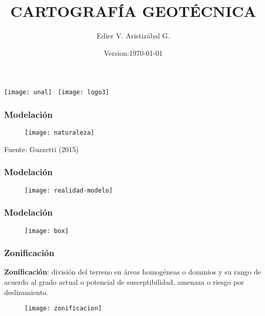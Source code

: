 \documentclass[12pt]{beamer}
\title[Principios de ocurrencia]{CARTOGRAFÍA GEOTÉCNICA}
\author[Edier Aristizábal]{Edier V. Aristizábal G.}
\institute{\emph{evaristizabalg@unal.edu.co}}
\date{Version:\today}
\begin{document}
\begin{frame}
\titlepage
\centering
\texttt{[image: unal]}\hspace*{4.75cm}~%
\texttt{[image: logo3]} 
\end{frame}
\begin{frame}
\frametitle{Modelación}
\begin{figure}
\centering
\texttt{[image: naturaleza]} 
\end{figure}
\tiny{Fuente: Guzzetti (2015)}
\end{frame}
\begin{frame}
\frametitle{Modelación}
\begin{figure}
\centering
\texttt{[image: realidad-modelo]} 
\end{figure}
\end{frame}
\begin{frame}
\frametitle{Modelación}
\begin{figure}
\centering
\texttt{[image: box]} 
\end{figure}
\end{frame}
\begin{frame}
\frametitle{Zonificación}
\scriptsize{
\textbf{Zonificación}: división del terreno en áreas homogéneas o dominios y su rango de acuerdo al grado actual o potencial de susceptibilidad, amenaza o riesgo por deslizamiento.
}
\begin{figure}
\centering
\texttt{[image: zonificacion]} 
\end{figure}
\end{frame}
\end{document}

